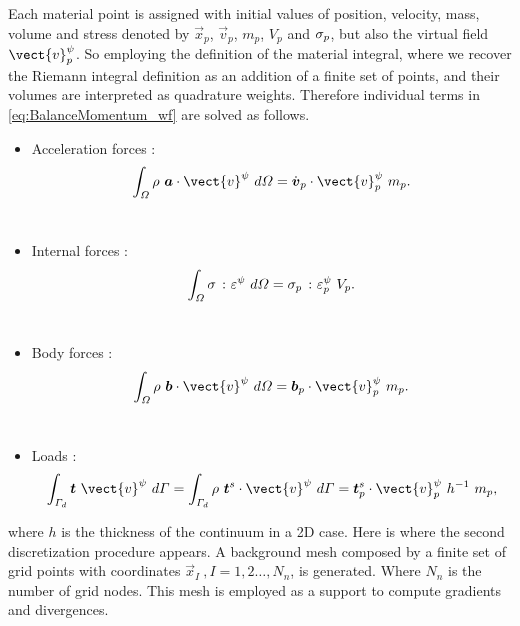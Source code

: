 
Each material point is assigned with initial values of position,
velocity, mass, volume and stress denoted by $\vec{x}_p$,
$\vec{v}_p$, $m_p$,  $V_p$ and $\mathsf{\sigma}_p$, but also the
virtual field $\vect{v}^{\psi}_{p}$. So employing the definition of the
material integral, where we recover the Riemann integral definition as
an addition of a finite set of points, and their volumes are
interpreted as quadrature weights. Therefore individual terms in
\eqref{eq:BalanceMomentum_wf} are solved as follows. 
\begin{itemize}
\item Acceleration forces :
\begin{equation}
    \label{eq:particle_acceleration_forces}
    \Integral{3}{\rho\ \vec{a} \cdot \vect{v}^{\psi}} =
    \dot{\vec{v}}_{p} \cdot \vect{v}^{\psi}_{p}\ m_p.
  \end{equation}\\
\item Internal forces :
  \begin{equation}
    \label{eq:particle_internal_forces}
    \Integral{3}{\tens{\sigma}\ \colon \tens{\varepsilon}^{\psi}} =
   \tens{\sigma}_{p}\ \colon \tens{\varepsilon}^{\psi}_p \ V_p.
  \end{equation}\\
\item Body forces :
\begin{equation}
  \label{eq:particle_body_forces}
  \Integral{3}{\rho\ \vec{b} \cdot \vect{v}^{\psi} } = 
  \vec{b}_{p} \cdot \vect{v}^{\psi}_p\ m_p.
\end{equation}\\
\item Loads :
\begin{equation}
  \begin{aligned}
    \label{eq:particle_load_forces}
    \Integral{2}{\vec{t}\ \vect{v}^{\psi}} = \Integral{2}{\rho\
      \vec{t}^s \cdot \vect{v}^{\psi}} = \vec{t}^s_{p} \cdot \vect{v}^{\psi}_{p}\ h^{-1}\ m_p ,
  \end{aligned} 
\end{equation}
\end{itemize}
where $h$ is the thickness of the continuum in a 2D case. Here is
where the second discretization procedure appears. A background mesh
composed by a finite set of grid points with coordinates $\vec{x}_I\
, I = 1,2\ldots ,N_n$, is generated. Where $N_n$ is the number of grid
nodes. This mesh is employed as a support to compute gradients and divergences. 

